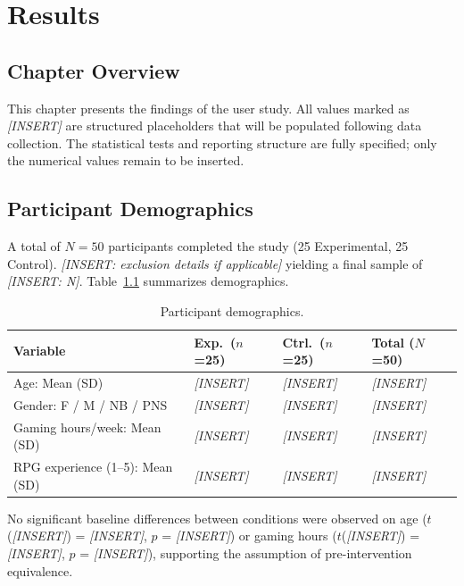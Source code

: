 \chapter{Results}

\section{Chapter Overview}

This chapter presents the findings of the user study. All values marked as \textit{[INSERT]} are structured placeholders that will be populated following data collection. The statistical tests and reporting structure are fully specified; only the numerical values remain to be inserted.

\section{Participant Demographics}

A total of $N = 50$ participants completed the study (25 Experimental, 25 Control). \textit{[INSERT: exclusion details if applicable]} yielding a final sample of \textit{[INSERT: N]}. Table~\ref{tab:demographics} summarizes demographics.

\begin{table}[H]
\centering
\caption{Participant demographics.}
\label{tab:demographics}
\small
\begin{tabular}{@{}llll@{}}
\toprule
\textbf{Variable} & \textbf{Exp.\ ($n$=25)} & \textbf{Ctrl.\ ($n$=25)} & \textbf{Total ($N$=50)} \\
\midrule
Age: Mean (SD) & \textit{[INSERT]} & \textit{[INSERT]} & \textit{[INSERT]} \\
Gender: F / M / NB / PNS & \textit{[INSERT]} & \textit{[INSERT]} & \textit{[INSERT]} \\
Gaming hours/week: Mean (SD) & \textit{[INSERT]} & \textit{[INSERT]} & \textit{[INSERT]} \\
RPG experience (1--5): Mean (SD) & \textit{[INSERT]} & \textit{[INSERT]} & \textit{[INSERT]} \\
\bottomrule
\end{tabular}
\end{table}

No significant baseline differences between conditions were observed on age ($t$(\textit{[INSERT]}) = \textit{[INSERT]}, $p$ = \textit{[INSERT]}) or gaming hours ($t$(\textit{[INSERT]}) = \textit{[INSERT]}, $p$ = \textit{[INSERT]}), supporting the assumption of pre-intervention equivalence.


